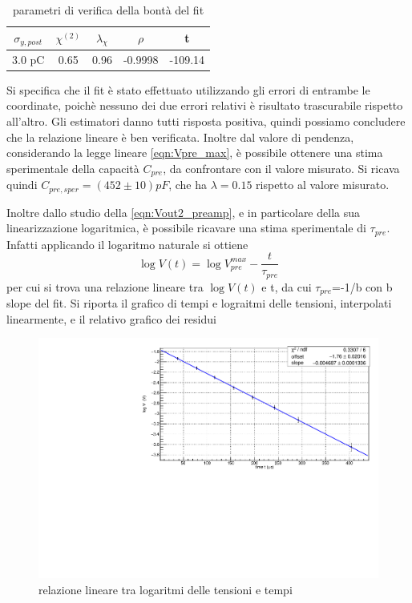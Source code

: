 \documentclass{article}
\begin{document}
\begin{table}[ht]
    \centering
    \begin{tabular}{ccccc}
        \toprule
        $\sigma_{y, post}$    &$\chi^{(2)}$    &$\lambda_{\chi}$   &$\rho$ &t      \\
        \midrule
        3.0 pC                  &0.65            &0.96               &-0.9998&-109.14\\
        \bottomrule
    \end{tabular}
    \caption{parametri di verifica della bontà del fit}
\end{table}

Si specifica che il fit è stato effettuato utilizzando
gli errori di entrambe le coordinate, poichè nessuno dei 
due errori relativi è risultato trascurabile rispetto all'altro.
Gli estimatori danno tutti risposta positiva, quindi possiamo concludere che la relazione lineare è ben verificata.
Inoltre dal valore di pendenza, considerando la legge lineare \ref{eqn:Vpre_max}, è possibile ottenere una stima sperimentale della capacità $C_{pre}$, 
da confrontare con il valore misurato. Si ricava quindi $C_{pre,sper} = (452\pm 10)pF$, che ha $\lambda = 0.15 $ rispetto al valore misurato.

Inoltre dallo studio della \ref{eqn:Vout2_preamp}, e in particolare della sua linearizzazione logaritmica, è possibile ricavare
una stima sperimentale di $\tau_{pre}$. Infatti applicando il logaritmo naturale si ottiene
\begin{equation}
    \log V(t) = \log V_{pre}^{max} - \frac{t}{\tau_{pre}}
\end{equation}
per cui si trova una relazione lineare tra $\log V(t)$ e t, da cui $\tau_{pre}$=-1/b con b slope del fit.
Si riporta il grafico di tempi e lograitmi delle tensioni, interpolati linearmente, e il relativo grafico dei residui

\begin{center}
\begin{figure}[H]
\centering
\includegraphics[scale=0.4, angle=0]{preampRC.pdf}
\caption{relazione lineare tra logaritmi delle tensioni e tempi}
\label{fig:QinvsVpre}
\end{figure}
\end{center}
\end{document}
